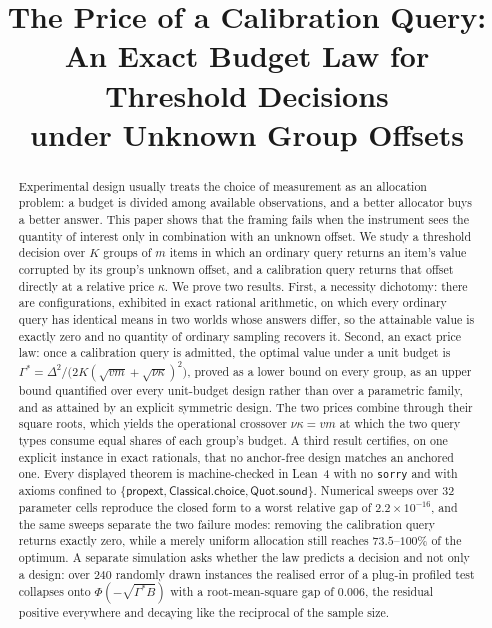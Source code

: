 



\title{The Price of a Calibration Query:\\
An Exact Budget Law for Threshold Decisions\\
under Unknown Group Offsets}

\author{
}

\maketitle

\begin{abstract}
Experimental design usually treats the choice of measurement as an allocation problem: a
budget is divided among available observations, and a better allocator buys a better
answer. This paper shows that the framing fails when the instrument sees the quantity of
interest only in combination with an unknown offset. We study a threshold decision over
$K$ groups of $m$ items in which an ordinary query returns an item's value corrupted by its
group's unknown offset, and a calibration query returns that offset directly at a relative
price $\kappa$. We prove two results. First, a necessity dichotomy: there are
configurations, exhibited in exact rational arithmetic, on which every ordinary query has
identical means in two worlds whose answers differ, so the attainable value is exactly zero
and no quantity of ordinary sampling recovers it. Second, an exact price law: once a
calibration query is admitted, the optimal value under a unit budget is
$\Gamma^{*}=\Delta^{2}/\bigl(2K(\sqrt{vm}+\sqrt{\nu\kappa})^{2}\bigr)$, proved as a lower bound
on every group, as an upper bound quantified over every unit-budget design rather than over
a parametric family, and as attained by an explicit symmetric design. The two prices
combine through their square roots, which yields the operational crossover $\nu\kappa=vm$ at
which the two query types consume equal shares of each group's budget. A third result
certifies, on one explicit instance in exact rationals, that no anchor-free design matches
an anchored one. Every displayed theorem is machine-checked in Lean~4 with no
\texttt{sorry} and with axioms confined to
$\{\textsf{propext},\textsf{Classical.choice},\textsf{Quot.sound}\}$. Numerical sweeps over
$32$ parameter cells reproduce the closed form to a worst relative gap of
$2.2\times10^{-16}$, and the same sweeps separate the two failure modes: removing the
calibration query returns exactly zero, while a merely uniform allocation still reaches
$73.5$--$100\%$ of the optimum. A separate simulation asks whether the law predicts a
decision and not only a design: over $240$ randomly drawn instances the realised error of a
plug-in profiled test collapses onto $\Phi(-\sqrt{\Gamma^{*}B})$ with a root-mean-square gap of
$0.006$, the residual positive everywhere and decaying like the reciprocal of the sample
size.
\end{abstract}

